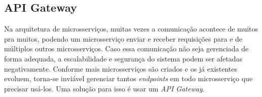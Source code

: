 




\subsection{API Gateway}\label{boas-praticas-api-gateway}
Na arquitetura de microsserviços, muitas vezes a comunicação acontece de muitos pra muitos, podendo um microsserviço enviar e receber requisições para e de múltiplos outros microsserviços. Caso essa comunicação não seja gerenciada de forma adequada, a escalabilidade e segurança do sistema podem ser afetadas negativamente. Conforme mais microsserviços são criados e os já existentes evoluem, torna-se inviável gerenciar tantos \emph{endpoints} em todo microsserviço que precisar usá-los. Uma solução para isso é usar um \emph{API Gateway}. \cite{livro-building-microservices}

